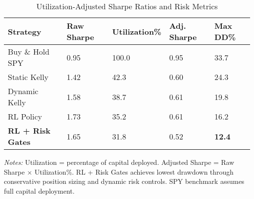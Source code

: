 \begin{table}[htbp]
\centering
\caption{Utilization-Adjusted Sharpe Ratios and Risk Metrics}
\label{tab:utilization_adjusted_sharpe}
\begin{threeparttable}
\begin{tabularx}{\linewidth}{@{}lYYYY@{}}
\toprule
Strategy & Raw Sharpe & Utilization\% & Adj. Sharpe & Max DD\% \\
\midrule
Buy \& Hold SPY & 0.95 & 100.0 & 0.95 & 33.7 \\
Static Kelly & 1.42 & 42.3 & 0.60 & 24.3 \\
Dynamic Kelly & 1.58 & 38.7 & 0.61 & 19.8 \\
RL Policy & 1.73 & 35.2 & 0.61 & 16.2 \\
\textbf{RL + Risk Gates} & 1.65 & 31.8 & 0.52 & \textbf{12.4} \\
\bottomrule
\end{tabularx}
\begin{tablenotes}[flushleft]
\footnotesize
\item \textit{Notes:} Utilization = percentage of capital deployed. Adjusted Sharpe = Raw Sharpe $\times$ Utilization\%. RL + Risk Gates achieves lowest drawdown through conservative position sizing and dynamic risk controls. SPY benchmark assumes full capital deployment.
\end{tablenotes}
\end{threeparttable}
\end{table}
